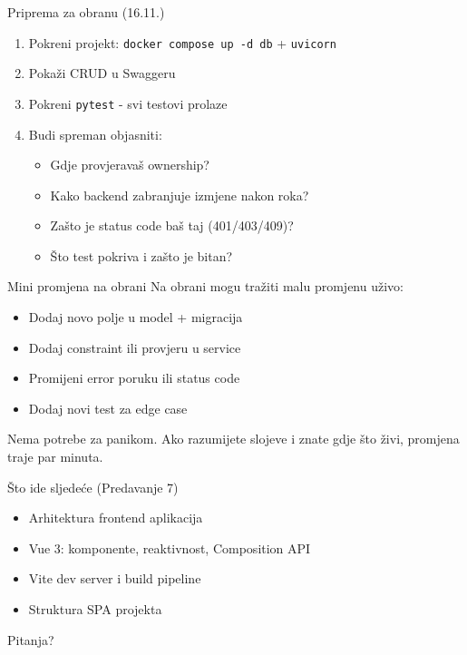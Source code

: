 \begin{frame}{Priprema za obranu (16.11.)}
\begin{enumerate}
  \item Pokreni projekt: \texttt{docker compose up -d db} + \texttt{uvicorn}
  \item Pokaži CRUD u Swaggeru
  \item Pokreni \texttt{pytest} - svi testovi prolaze
  \item Budi spreman objasniti:
  \begin{itemize}
    \item Gdje provjeravaš ownership?
    \item Kako backend zabranjuje izmjene nakon roka?
    \item Zašto je status code baš taj (401/403/409)?
    \item Što test pokriva i zašto je bitan?
  \end{itemize}
\end{enumerate}
\end{frame}

\begin{frame}{Mini promjena na obrani}
Na obrani mogu tražiti malu promjenu uživo:
\begin{itemize}
  \item Dodaj novo polje u model + migracija
  \item Dodaj constraint ili provjeru u service
  \item Promijeni error poruku ili status code
  \item Dodaj novi test za edge case
\end{itemize}

\vspace{0.6em}
Nema potrebe za panikom. Ako razumijete slojeve i znate gdje što živi, promjena traje par minuta.
\end{frame}

\begin{frame}{Što ide sljedeće (Predavanje 7)}
\begin{itemize}
  \item Arhitektura frontend aplikacija
  \item Vue 3: komponente, reaktivnost, Composition API
  \item Vite dev server i build pipeline
  \item Struktura SPA projekta
\end{itemize}

\vspace{0.8em}
\begin{center}
\Large Pitanja?
\end{center}
\end{frame}


